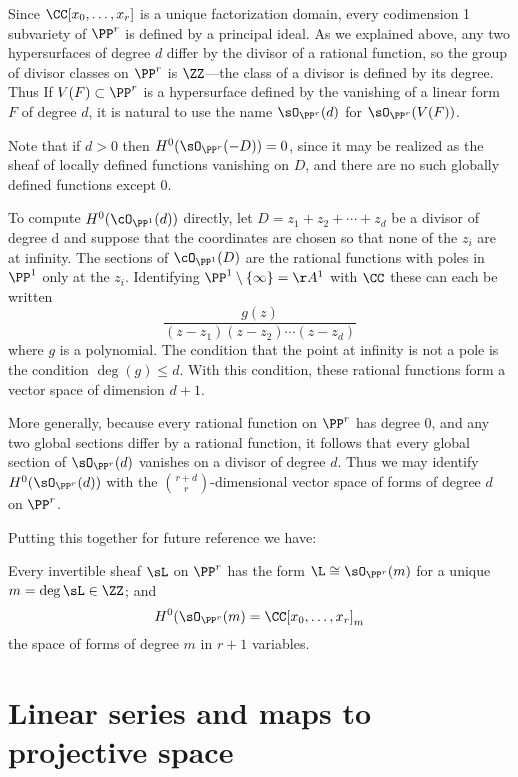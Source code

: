 \begin{example} \label{linear series on Pr} Since $\CC[x_0,\dots,x_r]$ is a 
unique factorization domain, every codimension 1 subvariety of $\PP^r$ is defined by a principal ideal. As we explained above,
any two hypersurfaces of degree $d$ differ by the divisor of a rational function, so
the group of divisor classes on $\PP^r$ is $\ZZ$---the class of a divisor is defined by its degree.
Thus If $V(F)\subset \PP^{r}$ is a hypersurface defined by the vanishing of a linear form 
$F$ of degree $d$,
it is natural to use the name $\sO_{\PP^r}(d)$  for $\sO_{\PP^r}(V(F))$.

Note that if $d>0$ then $H^{0}(\sO_{\PP^{r}}(-D)) = 0$, since it may be realized
as the sheaf of locally defined functions vanishing on $D$, and there are no such
globally defined functions except 0.
 
To compute $H^0(\cO_{\PP^1} (d))$ directly, let $D = z_1 +z_2 +\cdots+z_d$ be a divisor of degree d and suppose that the coordinates are chosen so that none of the $z_i$ are at infinity. The sections of $\cO_{\PP^1} (D)$ are the rational functions with poles in $\PP^1$ only at 
the $z_i$. Identifying $\PP^1\setminus \{\infty\} = \AA^1$ with $\CC$ these can each be written
$$
\frac{g(z)}{(z-z_1)(z-z_2)\cdots(z-z_d)}
$$
where $g$ is a polynomial. The condition that the point at infinity is not a pole is the condition $\deg(g) \leq d$. With this condition, these rational functions form a vector space of dimension $d+1$.

More generally, because every
rational function on $\PP^{r}$ has degree 0, and any two global sections differ by a rational
function, it follows that every global section of $\sO_{\PP^{r}}(d)$ vanishes on a divisor of degree $d$. Thus
we may identify $H^{0}(\sO_{\PP^{r}}(d))$ with the ${r+d\choose r}$-dimensional vector space of forms of degree $d$ on $\PP^{r}$.

Putting this together for future reference we have:
\begin{proposition}
 Every invertible sheaf $\sL$ on $\PP^r$ has the form $\L \cong \sO_{\PP^r}(m)$ for a unique $m = \deg \sL \in \ZZ$; and
 $$
 H^0(\sO_{\PP^r}(m) = \CC[x_0,\dots, x_r]_m
 $$
 the space of forms of degree $m$ in $r+1$ variables.
\end{proposition}
\end{example}


\section{Linear series and maps to projective space}

